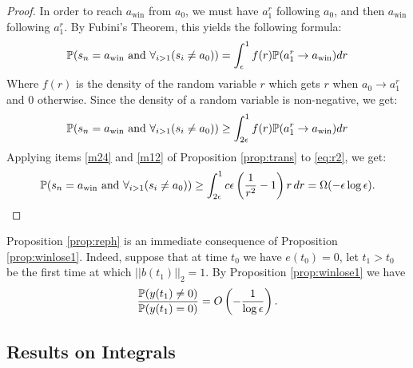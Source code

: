 {\begin{proof}
 In order to reach $a_\text{win}$ from $a_0$, we must have $a_1^r$ following $a_0$, and then $a_\text{win}$
  following $a_1^r$. By Fubini's Theorem, this yields the following formula:
 \begin{equation}\label{eq:r1}
 \P(s_n=a_\text{win} \text{ and } \ds\forall_{i>1}(s_i\neq a_0))=\ds\int_{\epsilon}^1 f(r) \P(a^r_1\rightarrow a_\text{win}) dr
 \end{equation}
 Where $f(r)$ is the density of the random variable $r$ which gets $r$ when
 $a_0\rightarrow a^r_1$ and $0$ otherwise. Since the density of a random variable is non-negative, we get:
 \begin{equation}\label{eq:r2}
 \P(s_n=a_\text{win} \text{ and } \ds\forall_{i>1}(s_i\neq a_0))\ge\ds\int_{2\epsilon}^1 f(r) \P(a^r_1\rightarrow a_\text{win}) dr
 \end{equation}
Applying items \ref{m24} and \ref{m12} of Proposition \ref{prop:trans} to \eqref{eq:r2}, we get:
\begin{equation}\label{eq:r3}
 \P(s_n=a_\text{win} \text{ and } \ds\forall_{i>1}(s_i\neq a_0))\ge \ds\int_{2\epsilon}^1 c\epsilon\left(\frac{1}{r^2}-1\right)r\, dr = \Omega(-\epsilon\log\epsilon).
\end{equation}
\end{proof}

Proposition \ref{prop:reph} is an immediate consequence of Proposition
\ref{prop:winlose1}. Indeed, suppose that at time $t_0$ we have
$e(t_0)=0$, let $t_1>t_0$ be the first time at which $||b(t_1)||_2=1$.
By Proposition \ref{prop:winlose1} we have
$$\frac{\P (y(t_1)\neq0)}{\P (y(t_1)=0)}=O\left(-\frac 1 {\log\epsilon}\right).$$

\subsection{Results on Integrals}\label{sec:ROI}

}
